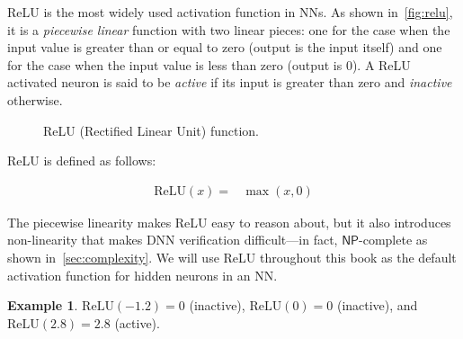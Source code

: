 \documentclass[oneside,11pt,dvipsnames]{book}
\numberwithin{equation}{section}
\theoremstyle{definition}
\newtheorem{example}{Example}[section]
\theoremstyle{remark}
\newcommand{\relu}[1]{\mathrm{ReLU}\left(#1\right)}
\begin{document}
ReLU is the most widely used activation function in NNs.  As shown in~\autoref{fig:relu}, it is a  \emph{piecewise linear} function with two linear pieces: one for the case when the input value is greater than or equal to zero (output is the input itself) and one for the case when the input value is less than zero (output is 0). A ReLU activated neuron is said to be \emph{active} if its input is greater than zero and \emph{inactive} otherwise.

\begin{figure}[h]
    \centering
    \caption{ReLU (Rectified Linear Unit) function.}\label{fig:relu}
\end{figure}


ReLU is defined as follows:

\begin{align}
\relu{x} = &\max(x,0)
\end{align}


The piecewise linearity makes ReLU easy to reason about, but it also introduces non-linearity that makes DNN verification difficult---in fact, $\mathsf{NP}$-complete as shown in~\autoref{sec:complexity}. We will use ReLU throughout this book as the default activation function for hidden neurons in an NN. 
    
\begin{example}
$\relu{-1.2} = 0$ (inactive), $\relu{0} = 0$ (inactive), and $\relu{2.8} = 2.8$ (active).
\end{example}
\end{document}
